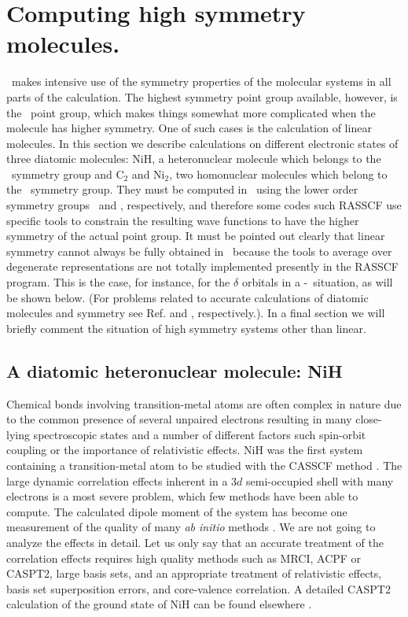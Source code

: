 \section{Computing high symmetry molecules.}
\label{TUT:sec:x2}

\molcas\ makes intensive use of the symmetry properties of the
molecular systems in all parts of the calculation. The highest 
symmetry point group available, 
however, is the \Dth\ point group, which makes things somewhat 
more complicated when the molecule has higher symmetry.
One of such cases is the calculation of linear molecules.
In this section we describe calculations on
different electronic states of three diatomic molecules:
NiH, a heteronuclear molecule which belongs to the \Cinfv\
symmetry group and C$_2$ and Ni$_2$, two homonuclear molecules which belong
to the \Dinfh\ symmetry group. They must be computed in
\molcas\ using the lower order symmetry groups \Ctv\ and
\Dth, respectively, and therefore some codes such RASSCF use specific tools
to constrain the resulting wave functions
to have the higher symmetry of the actual point group.
It must be pointed out clearly that linear symmetry cannot always be fully
obtained in \molcas\ because the tools to average over degenerate representations 
are not totally implemented presently in the 
RASSCF program. This is the case, for instance, for the $\delta$
orbitals in a \Ctv-\Cinfv\ situation, as will be shown below.
(For problems related to accurate calculations of diatomic 
molecules and symmetry see Ref. \cite{Partridge:95} and 
\cite{Taylor:92a}, respectively.).
In a final section we will briefly comment the situation of
high symmetry systems other than linear.

\subsection{A diatomic heteronuclear molecule: NiH}
\label{TUT:sec:nih}

Chemical bonds involving transition-metal atoms are often 
complex in nature due to the common presence of several unpaired 
electrons resulting in many close-lying spectroscopic states
and a number of different factors such spin-orbit coupling or the
importance of relativistic effects. NiH was the first
system containing a transition-metal atom to be studied with
the CASSCF method \cite{Roos:82}. The large dynamic correlation 
effects inherent in a $3d$ semi-occupied shell with many electrons is 
a most severe problem, which few methods have been able to compute. The
calculated dipole moment of the system has become one measurement
of the quality of many {\it ab initio} methods \cite{Roos:87}.
We are not going to analyze the effects in detail. Let us only 
say that an accurate treatment of the correlation effects
requires high quality methods such as MRCI, ACPF or CASPT2,
large basis sets, and an appropriate treatment of
relativistic effects, basis set superposition errors,
and core-valence correlation. A detailed CASPT2 calculation
of the ground state of NiH can be found elsewhere \cite{Pou:94}.



